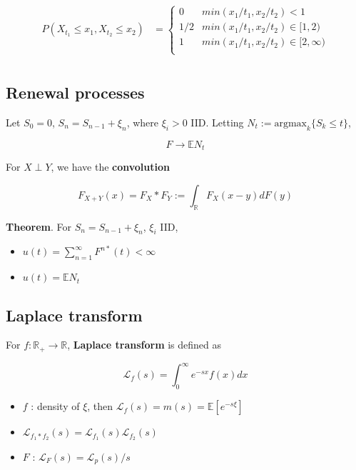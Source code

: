 \documentclass[12pt]{article}
\theoremstyle{nonumberbreak}
\begin{document}
$$
\begin{aligned}
P(X_{t_1} \le x_1, X_{t_2} \le x_2) &=
\begin{cases}
0 & min(x_1/t_1, x_2/t_2) < 1 \\
1/2 & min(x_1/t_1, x_2/t_2) \in [1,2) \\
1 & min(x_1/t_1, x_2/t_2) \in [2,\infty) \\
\end{cases} \\[8pt]
\end{aligned}
$$


\subsection{Renewal processes}

Let $S_0 = 0$, $S_n = S_{n-1} + \xi_n$, where $\xi_i >0$ IID. Letting $N_t := \mathrm{argmax}_k \{S_k \le t\}$, 

$$
F \to \mathbb{E} N_t
$$

For $X \perp Y$, we have the \textbf{convolution}

$$
F_{X+Y}(x) = F_X \ast F_Y := \int_{\mathbb{R}} F_X(x-y) dF(y)
$$

\begin{theorem}
\textbf{Theorem}. For $S_n = S_{n-1} + \xi_n$, $\xi_i$ IID,
\begin{itemize}
	\item $u(t) = \sum_{n=1}^\infty F^{n\ast} (t) < \infty$
	\item $u(t) = \mathbb{E} N_t$
\end{itemize}
\end{theorem}

\subsection{Laplace transform}



For $f : \mathbb{R}_+ \to \mathbb{R}$, \textbf{Laplace transform} is defined as 

$$
\mathcal{L}_f(s) = \int_0^\infty e^{-sx} f(x) dx
$$

\begin{itemize}
	\item $f$ : density of $\xi$, then $\mathcal{L}_f(s) = m(s) = \mathbb{E}[e^{-s\xi}]$
	\item $\mathcal{L}_{f_1 \ast f_2} (s) = \mathcal{L}_{f_1} (s) \mathcal{L}_{f_2} (s)$ 
	\item $F$ : $\mathcal{L}_F(s) = \mathcal{L}_p(s)/s$
\end{itemize}
\end{document}
